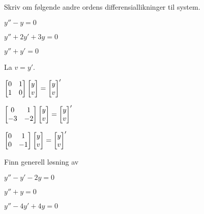 
\begin{oppgave}
Skriv om følgende andre ordens differensiallikninger til system.

\begin{punkt}
$y''-y=0$
\end{punkt}

\begin{punkt}
	$y''+2y'+3y=0$
\end{punkt}

\begin{punkt}
	$y''+y'=0$
\end{punkt}


\end{oppgave}

\begin{losning} La $v=y'$.
	
	\begin{punkt}$\begin{bmatrix}
		0 & 1\\
		1 & 0
		\end{bmatrix} \begin{bmatrix} y \\ v \end{bmatrix}=\begin{bmatrix} y \\ v \end{bmatrix}'
		$
	\end{punkt}
	
	\begin{punkt}$\begin{bmatrix}
		0 & 1\\
		-3 & -2
		\end{bmatrix} \begin{bmatrix} y \\ v \end{bmatrix}=\begin{bmatrix} y \\ v \end{bmatrix}'
		$
	\end{punkt}
	
	\begin{punkt}$\begin{bmatrix}
		0 & 1\\
		0 & -1
		\end{bmatrix} \begin{bmatrix} y \\ v \end{bmatrix}=\begin{bmatrix} y \\ v \end{bmatrix}'
		$
	\end{punkt}
	
\end{losning}

\begin{oppgave}
Finn generell løsning av
\begin{punkt}
	$y''-y'-2y=0$
\end{punkt}

\begin{punkt}
	$y''+y=0$
\end{punkt}

\begin{punkt}
	$y''-4y'+4y=0$
\end{punkt}

\end{oppgave}


